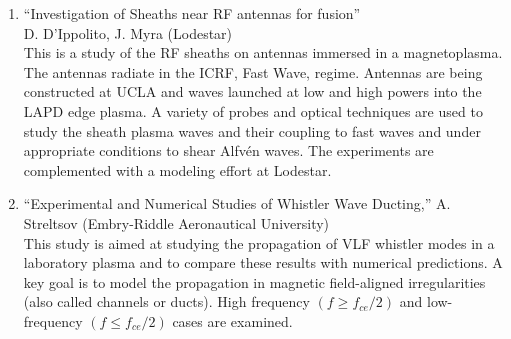 \documentclass[11pt]{article}
\begin{document}
\begin{enumerate}


\item ``Investigation of Sheaths near RF antennas for fusion''\\ D.
  D'Ippolito, J. Myra (Lodestar)\\ This is a study of the RF sheaths on antennas
  immersed in a magnetoplasma. The antennas radiate in the ICRF, Fast
  Wave, regime. Antennas are being constructed at UCLA and waves
  launched at low and high powers into the LAPD edge plasma. A variety
  of probes and optical techniques are used to study the sheath
  plasma waves and their coupling to fast waves and under appropriate
  conditions to shear Alfv\'{e}n waves. The experiments are
  complemented with a modeling effort at Lodestar.\\

\item ``Experimental and Numerical Studies of Whistler Wave Ducting,''
  A. Streltsov (Embry-Riddle Aeronautical University)\\ This study is
  aimed at studying the propagation of VLF whistler modes in a
  laboratory plasma and to compare these results with numerical
  predictions. A key goal is to model the propagation in magnetic
  field-aligned irregularities (also called channels or ducts). High
  frequency $(f \ge f_{ce}/2)$ and low-frequency $(f \le f_{ce}/2)$
  cases are examined.





\end{enumerate}
\end{document}
